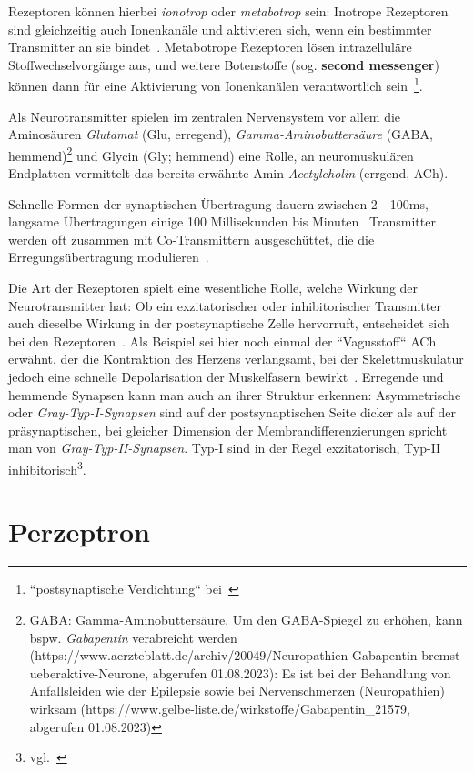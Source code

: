 {Rezeptoren können hierbei \textit{ionotrop} oder \textit{metabotrop} sein: Inotrope Rezeptoren sind gleichzeitig auch Ionenkanäle und aktivieren sich, wenn ein bestimmter Transmitter an sie bindet~\cite[109]{HS19b}.
Metabotrope Rezeptoren lösen intrazelluläre Stoffwechselvorgänge aus, und weitere Botenstoffe (sog. \textbf{second messenger}) können dann für eine Aktivierung von Ionenkanälen verantwortlich sein~\cite[134]{RK18}\footnote{
    ``postsynaptische Verdichtung`` bei~\cite[123]{BCP18}
}.

Als Neurotransmitter spielen im zentralen Nervensystem vor allem  die Aminosäuren \textit{Glutamat} (Glu, erregend), \textit{Gamma-Aminobuttersäure} (GABA, hemmend)\footnote{
    GABA: Gamma-Aminobuttersäure. Um den GABA-Spiegel zu erhöhen, kann bspw. \textit{Gabapentin} verabreicht werden (https://www.aerzteblatt.de/archiv/20049/Neuropathien-Gabapentin-bremst-ueberaktive-Neurone, abgerufen 01.08.2023): Es ist bei der Behandlung von Anfallsleiden wie der Epilepsie sowie bei Nervenschmerzen (Neuropathien) wirksam (https://www.gelbe-liste.de/wirkstoffe/Gabapentin_21579, abgerufen 01.08.2023)
} und Glycin (Gly; hemmend) eine Rolle, an neuromuskulären Endplatten vermittelt das bereits erwähnte Amin \textit{Acetylcholin} (errgend, ACh).

Schnelle Formen der synaptischen Übertragung dauern zwischen 2 - 100ms, langsame Übertragungen einige 100 Millisekunden bis Minuten~\cite[129 f.]{BCP18} Transmitter werden oft zusammen mit Co-Transmittern ausgeschüttet, die die Erregungsübertragung modulieren~\cite[52]{SD07}.

Die Art der Rezeptoren spielt eine wesentliche Rolle, welche Wirkung der Neurotransmitter hat: Ob ein exzitatorischer oder inhibitorischer Transmitter auch dieselbe Wirkung in der postsynaptische Zelle hervorruft, entscheidet sich bei den Rezeptoren~\cite[109]{HS19b}.
Als Beispiel sei hier noch einmal der ``Vagusstoff`` ACh erwähnt, der die Kontraktion des Herzens verlangsamt, bei der Skelettmuskulatur jedoch eine schnelle Depolarisation der Muskelfasern bewirkt~\cite[137]{BCP18}.
Erregende und hemmende Synapsen kann man auch an ihrer Struktur erkennen: Asymmetrische oder \textit{Gray-Typ-I-Synapsen} sind auf der postsynaptischen Seite dicker als auf der präsynaptischen, bei gleicher Dimension der Membrandifferenzierungen spricht man von \textit{Gray-Typ-II-Synapsen}. Typ-I sind in der Regel exzitatorisch, Typ-II inhibitorisch\footnote{
    vgl.~\cite[127 u. 147]{BCP18}
    }.


\section{Perzeptron}\label{appendix:perzeptron}
}
